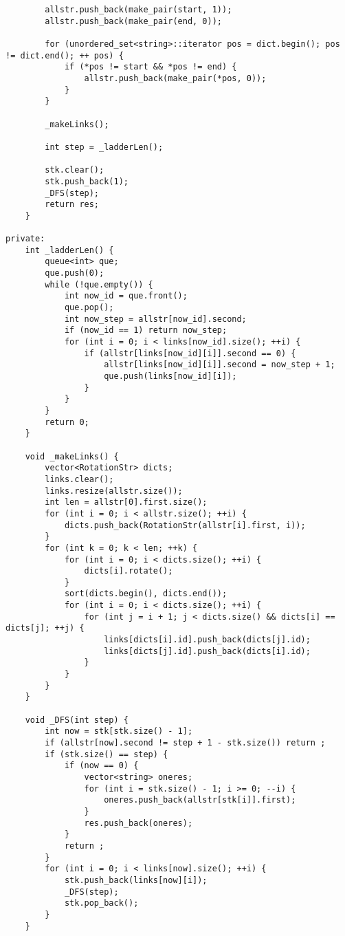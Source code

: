 \documentclass[courier]{article}
\begin{document}
\begin{CJK*}{UTF8}{gkai}
\begin{lstlisting}
        allstr.push_back(make_pair(start, 1));
        allstr.push_back(make_pair(end, 0));
        
        for (unordered_set<string>::iterator pos = dict.begin(); pos != dict.end(); ++ pos) {
            if (*pos != start && *pos != end) {
                allstr.push_back(make_pair(*pos, 0));
            }
        }
        
        _makeLinks();
        
        int step = _ladderLen();
        
        stk.clear();
        stk.push_back(1);
        _DFS(step);
        return res;
    }
    
private:
    int _ladderLen() {
        queue<int> que;
        que.push(0);
        while (!que.empty()) {
            int now_id = que.front();
            que.pop();
            int now_step = allstr[now_id].second;
            if (now_id == 1) return now_step;
            for (int i = 0; i < links[now_id].size(); ++i) {
                if (allstr[links[now_id][i]].second == 0) {
                    allstr[links[now_id][i]].second = now_step + 1;
                    que.push(links[now_id][i]);
                }
            }
        }
        return 0;
    }
    
    void _makeLinks() {
        vector<RotationStr> dicts;
        links.clear();
        links.resize(allstr.size());
        int len = allstr[0].first.size();
        for (int i = 0; i < allstr.size(); ++i) {
            dicts.push_back(RotationStr(allstr[i].first, i));
        }
        for (int k = 0; k < len; ++k) {
            for (int i = 0; i < dicts.size(); ++i) {
                dicts[i].rotate();
            }
            sort(dicts.begin(), dicts.end());
            for (int i = 0; i < dicts.size(); ++i) {
                for (int j = i + 1; j < dicts.size() && dicts[i] == dicts[j]; ++j) {
                    links[dicts[i].id].push_back(dicts[j].id);
                    links[dicts[j].id].push_back(dicts[i].id);
                }
            }
        }
    }
    
    void _DFS(int step) {
        int now = stk[stk.size() - 1];
        if (allstr[now].second != step + 1 - stk.size()) return ;
        if (stk.size() == step) {
            if (now == 0) {
                vector<string> oneres;
                for (int i = stk.size() - 1; i >= 0; --i) {
                    oneres.push_back(allstr[stk[i]].first);
                }
                res.push_back(oneres);
            }
            return ;
        }
        for (int i = 0; i < links[now].size(); ++i) {
            stk.push_back(links[now][i]);
            _DFS(step);
            stk.pop_back();
        }
    }
    

\end{lstlisting}
\end{CJK*}
\end{document}

